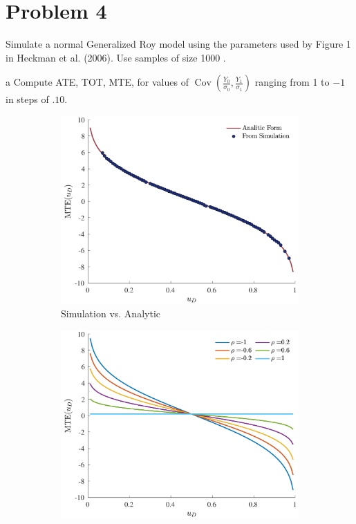 \documentclass{article}
\begin{document}
\section*{Problem 4}
Simulate a normal Generalized Roy model using the parameters used by Figure 1 in Heckman et al. (2006). Use samples of size 1000 .
\begin{problem}{a}
Compute ATE, TOT, MTE, for values of $\operatorname{Cov}\left(\frac{Y_{0}}{\sigma_{0}}, \frac{Y_{1}}{\sigma_{1}}\right)$ ranging from 1 to $-1$ in steps of $.10$.
\end{problem}
\begin{solution}
\begin{figure}[htb]
    \centering
    \caption{Marginal Treatment Effect}
    \label{ps1H:q4:fig1}
    \begin{subfigure}[b]{0.43\textwidth}
         \centering
         \includegraphics[width=\textwidth]{ps1Heckman/Figures/MTEcompare.pdf}
         \caption{Simulation vs. Analytic}
     \end{subfigure}
     \begin{subfigure}[b]{0.43\textwidth}
         \centering
         \includegraphics[width=\textwidth]{ps1Heckman/Figures/MTEgrid.pdf}

\end{subfigure}
\end{figure}
\end{solution}
\end{document}
